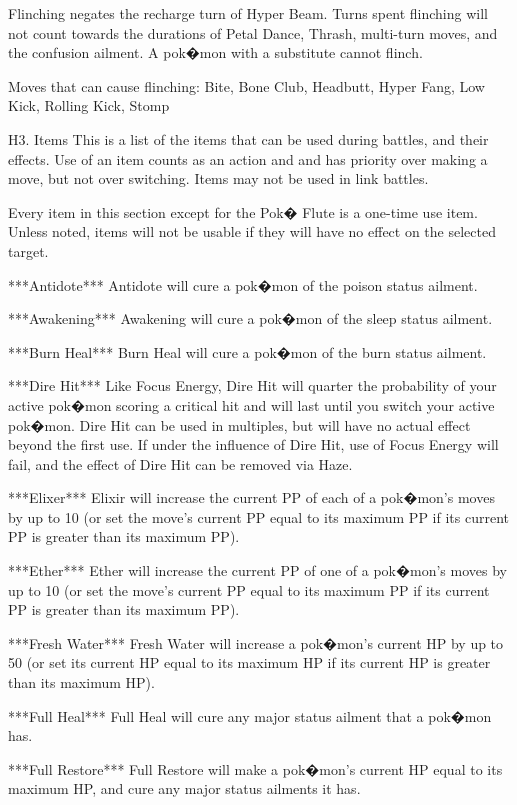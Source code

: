 \documentclass[reprint, aps, prl, paper=A4]{revtex4-1}
\begin{document}
Flinching negates the recharge turn of Hyper Beam. Turns spent flinching will not count towards
the durations of Petal Dance, Thrash, multi-turn moves, and the confusion ailment. A pok�mon
with a substitute cannot flinch.

Moves that can cause flinching: Bite, Bone Club, Headbutt, Hyper Fang, Low Kick, Rolling Kick,
          Stomp


H3. Items
This is a list of the items that can be used during battles, and their effects. Use of an item
counts as an action and and has priority over making a move, but not over switching. Items
may not be used in link battles.

Every item in this section except for the Pok� Flute is a one-time use item. Unless noted,
items will not be usable if they will have no effect on the selected target.


***Antidote***
Antidote will cure a pok�mon of the poison status ailment.

***Awakening***
Awakening will cure a pok�mon of the sleep status ailment.

***Burn Heal***
Burn Heal will cure a pok�mon of the burn status ailment.

***Dire Hit***
Like Focus Energy, Dire Hit will quarter the probability of your active pok�mon scoring a
critical hit and will last until you switch your active pok�mon. Dire Hit can be used in
multiples, but will have no actual effect beyond the first use. If under the influence of Dire
Hit, use of Focus Energy will fail, and the effect of Dire Hit can be removed via Haze.

***Elixer***
Elixir will increase the current PP of each of a pok�mon's moves by up to 10 (or set the move's
current PP equal to its maximum PP if its current PP is greater than its maximum PP).

***Ether***
Ether will increase the current PP of one of a pok�mon's moves by up to 10 (or set the move's
current PP equal to its maximum PP if its current PP is greater than its maximum PP).

***Fresh Water***
Fresh Water will increase a pok�mon's current HP by up to 50 (or set its current HP equal to
its maximum HP if its current HP is greater than its maximum HP).

***Full Heal***
Full Heal will cure any major status ailment that a pok�mon has.

***Full Restore***
Full Restore will make a pok�mon's current HP equal to its maximum HP, and cure any major
status ailments it has.
\end{document}
